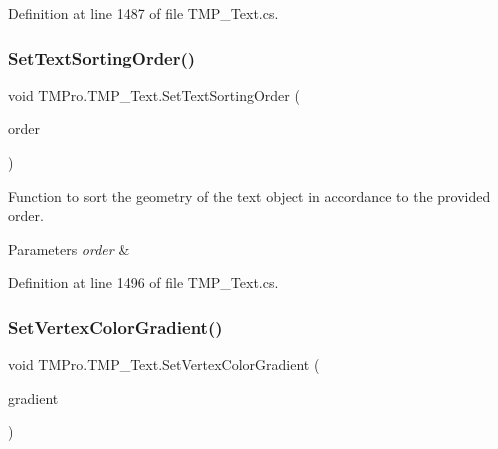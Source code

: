 Definition at line 1487 of file T\+M\+P\+\_\+\+Text.\+cs.

\mbox{\label{class_t_m_pro_1_1_t_m_p___text_ae2ef03960db59b16eaa50cf1198cb1db}} 
\subsubsection{\texorpdfstring{SetTextSortingOrder()}{SetTextSortingOrder()}\hspace{0.1cm}{\footnotesize\ttfamily [2/2]}}
{\footnotesize\ttfamily void T\+M\+Pro.\+T\+M\+P\+\_\+\+Text.\+Set\+Text\+Sorting\+Order (\begin{DoxyParamCaption}\item[{int \mbox{[}$\,$\mbox{]}}]{order }\end{DoxyParamCaption})\hspace{0.3cm}{\ttfamily [protected]}}



Function to sort the geometry of the text object in accordance to the provided order. 


\begin{DoxyParams}{Parameters}
{\em order} & \\
\hline
\end{DoxyParams}


Definition at line 1496 of file T\+M\+P\+\_\+\+Text.\+cs.

\mbox{\label{class_t_m_pro_1_1_t_m_p___text_a58e0c2575bd97d94fb49a000706ffcb3}} 
\subsubsection{\texorpdfstring{SetVertexColorGradient()}{SetVertexColorGradient()}}
{\footnotesize\ttfamily void T\+M\+Pro.\+T\+M\+P\+\_\+\+Text.\+Set\+Vertex\+Color\+Gradient (\begin{DoxyParamCaption}\item[{\mbox{\hyperlink{class_t_m_pro_1_1_t_m_p___color_gradient}{T\+M\+P\+\_\+\+Color\+Gradient}}}]{gradient }\end{DoxyParamCaption})\hspace{0.3cm}{\ttfamily [protected]}}




